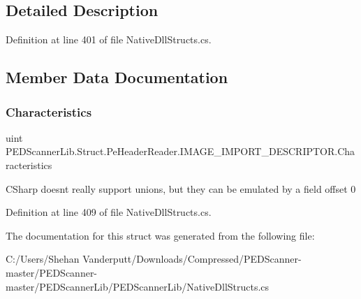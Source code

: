 \subsection{Detailed Description}


Definition at line 401 of file Native\+Dll\+Structs.\+cs.



\subsection{Member Data Documentation}
\mbox{\label{struct_p_e_d_scanner_lib_1_1_struct_1_1_pe_header_reader_1_1_i_m_a_g_e___i_m_p_o_r_t___d_e_s_c_r_i_p_t_o_r_a9bc2e4d3a96d1b0d8b6a016d2c50ec5b}} 
\subsubsection{\texorpdfstring{Characteristics}{Characteristics}}
{\footnotesize\ttfamily uint P\+E\+D\+Scanner\+Lib.\+Struct.\+Pe\+Header\+Reader.\+I\+M\+A\+G\+E\+\_\+\+I\+M\+P\+O\+R\+T\+\_\+\+D\+E\+S\+C\+R\+I\+P\+T\+O\+R.\+Characteristics}



C\+Sharp doesnt really support unions, but they can be emulated by a field offset 0 



Definition at line 409 of file Native\+Dll\+Structs.\+cs.



The documentation for this struct was generated from the following file\+:\begin{DoxyCompactItemize}
\item 
C\+:/\+Users/\+Shehan Vanderputt/\+Downloads/\+Compressed/\+P\+E\+D\+Scanner-\/master/\+P\+E\+D\+Scanner-\/master/\+P\+E\+D\+Scanner\+Lib/\+P\+E\+D\+Scanner\+Lib/Native\+Dll\+Structs.\+cs\end{DoxyCompactItemize}
